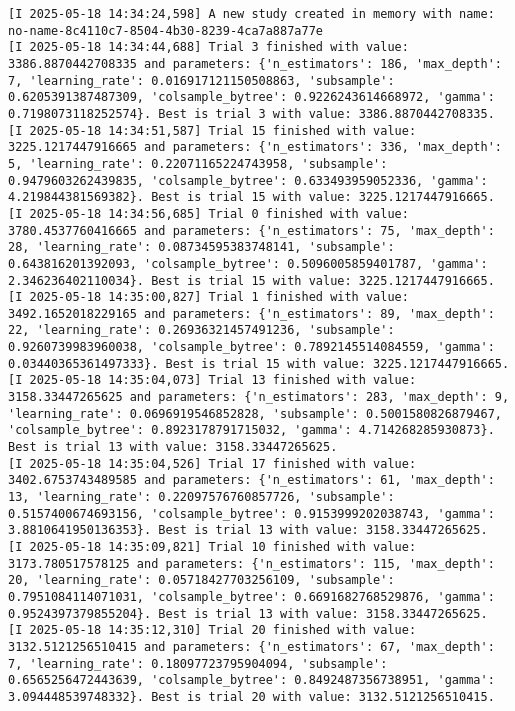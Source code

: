 \documentclass[
  letterpaper,
  DIV=11,
  numbers=noendperiod]{scrreprt}
\begin{document}
\begin{verbatim}
[I 2025-05-18 14:34:24,598] A new study created in memory with name: no-name-8c4110c7-8504-4b30-8239-4ca7a887a77e
[I 2025-05-18 14:34:44,688] Trial 3 finished with value: 3386.8870442708335 and parameters: {'n_estimators': 186, 'max_depth': 7, 'learning_rate': 0.016917121150508863, 'subsample': 0.6205391387487309, 'colsample_bytree': 0.9226243614668972, 'gamma': 0.7198073118252574}. Best is trial 3 with value: 3386.8870442708335.
[I 2025-05-18 14:34:51,587] Trial 15 finished with value: 3225.1217447916665 and parameters: {'n_estimators': 336, 'max_depth': 5, 'learning_rate': 0.22071165224743958, 'subsample': 0.9479603262439835, 'colsample_bytree': 0.633493959052336, 'gamma': 4.219844381569382}. Best is trial 15 with value: 3225.1217447916665.
[I 2025-05-18 14:34:56,685] Trial 0 finished with value: 3780.4537760416665 and parameters: {'n_estimators': 75, 'max_depth': 28, 'learning_rate': 0.08734595383748141, 'subsample': 0.643816201392093, 'colsample_bytree': 0.5096005859401787, 'gamma': 2.346236402110034}. Best is trial 15 with value: 3225.1217447916665.
[I 2025-05-18 14:35:00,827] Trial 1 finished with value: 3492.1652018229165 and parameters: {'n_estimators': 89, 'max_depth': 22, 'learning_rate': 0.26936321457491236, 'subsample': 0.9260739983960038, 'colsample_bytree': 0.7892145514084559, 'gamma': 0.03440365361497333}. Best is trial 15 with value: 3225.1217447916665.
[I 2025-05-18 14:35:04,073] Trial 13 finished with value: 3158.33447265625 and parameters: {'n_estimators': 283, 'max_depth': 9, 'learning_rate': 0.0696919546852828, 'subsample': 0.5001580826879467, 'colsample_bytree': 0.8923178791715032, 'gamma': 4.714268285930873}. Best is trial 13 with value: 3158.33447265625.
[I 2025-05-18 14:35:04,526] Trial 17 finished with value: 3402.6753743489585 and parameters: {'n_estimators': 61, 'max_depth': 13, 'learning_rate': 0.22097576760857726, 'subsample': 0.5157400674693156, 'colsample_bytree': 0.9153999202038743, 'gamma': 3.8810641950136353}. Best is trial 13 with value: 3158.33447265625.
[I 2025-05-18 14:35:09,821] Trial 10 finished with value: 3173.780517578125 and parameters: {'n_estimators': 115, 'max_depth': 20, 'learning_rate': 0.05718427703256109, 'subsample': 0.7951084114071031, 'colsample_bytree': 0.6691682768529876, 'gamma': 0.9524397379855204}. Best is trial 13 with value: 3158.33447265625.
[I 2025-05-18 14:35:12,310] Trial 20 finished with value: 3132.5121256510415 and parameters: {'n_estimators': 67, 'max_depth': 7, 'learning_rate': 0.18097723795904094, 'subsample': 0.6565256472443639, 'colsample_bytree': 0.8492487356738951, 'gamma': 3.094448539748332}. Best is trial 20 with value: 3132.5121256510415.

\end{verbatim}
\end{document}
